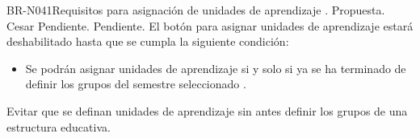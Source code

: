 \begin{BusinessRule}{BR-N041}{Requisitos para asignación de unidades de aprendizaje}
	{\bcCondition}    %
	{\btEnabler}     %
	{\blControlling}    %
	.
	\BRItem[Estado] Propuesta.
	 Cesar
	 Pendiente.
	 Pendiente.
	\BRItem[Descripción] El botón para asignar unidades de aprendizaje estará deshabilitado hasta que se cumpla la siguiente condición:\\
		\begin{itemize}
			\item Se podrán asignar unidades de aprendizaje si y solo si ya se ha terminado de definir los grupos del semestre seleccionado .
		\end{itemize}
	\BRItem[Motivación] Evitar que se definan unidades de aprendizaje sin antes definir los grupos de una estructura educativa.
\end{BusinessRule}
